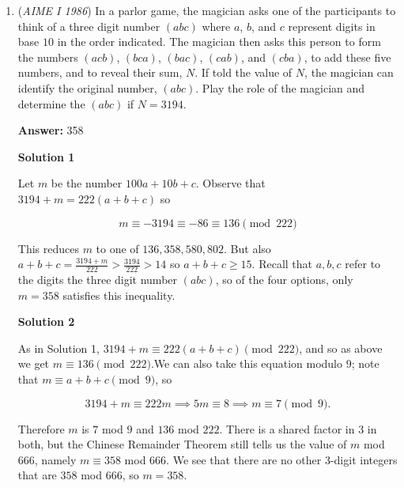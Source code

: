 \begin{enumerate}
            \begin{itemize}
        \item I did not show the multiplication in the last equation because most of it cancels out when solving.
            \end{itemize}
            (Note: I chose $F'P$ to be $x$ only because that is what I had written when originally solving. The solution would work with other choices for $x$.)

 


	\item (\textit{AIME I 1986}) In a parlor game, the magician asks one of the participants to think of a three digit number $(abc)$ where $a$, $b$, and $c$ represent digits in base $10$ in the order indicated. The magician then asks this person to form the numbers $(acb)$, $(bca)$, $(bac)$, $(cab)$, and $(cba)$, to add these five numbers, and to reveal their sum, $N$. If told the value of $N$, the magician can identify the original number, $(abc)$. Play the role of the magician and determine the $(abc)$ if $N= 3194$.


 
 \textbf{Answer: }358



\textbf{Solution 1}

Let $m$ be the number $100a+10b+c$. Observe that $3194+m=222(a+b+c)$ so

 
 \[m\equiv -3194\equiv -86\equiv 136\pmod{222}\]

 This reduces $m$ to one of $136, 358, 580, 802$. But also $a+b+c=\frac{3194+m}{222}>\frac{3194}{222}>14$ so $a+b+c\geq 15$. Recall that $a, b, c$ refer to the digits the three digit number $(abc)$, so of the four options, only $m = \boxed{358}$ satisfies this inequality.

 



\textbf{Solution 2}

As in Solution 1, $3194 + m \equiv 222(a+b+c) \pmod{222}$, and so as above we get $m \equiv 136 \pmod{222}$.We can also take this equation modulo $9$; note that $m \equiv a+b+c \pmod{9}$, so

 
 \[3194 + m \equiv 222m \implies 5m \equiv 8 \implies m \equiv 7 \pmod{9}.\]

 Therefore $m$ is $7$ mod $9$ and $136$ mod $222$. There is a shared factor in $3$ in both, but the Chinese Remainder Theorem still tells us the value of $m$ mod $666$, namely $m \equiv 358$ mod $666$. We see that there are no other 3-digit integers that are $358$ mod $666$, so $m = \boxed{358}$.


\end{enumerate}
